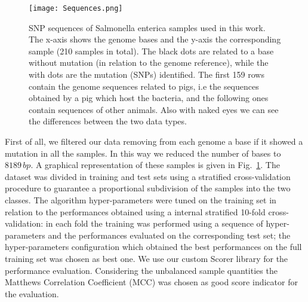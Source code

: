 \documentclass{standalone}
\begin{document}
\begin{figure}[htbp]
\centering
% 
\texttt{[image: Sequences.png]}
\caption{SNP sequences of Salmonella enterica samples used in this work.
The x-axis shows the genome bases and the y-axis the corresponding sample (210 samples in total).
The black dots are related to a base without mutation (in relation to the genome reference), while the with dots are the mutation (SNPs) identified.
The first 159 rows contain the genome sequences related to pigs, i.e the sequences obtained by a pig which host the bacteria, and the following ones contain sequences of other animals.
Also with naked eyes we can see the differences between the two data types.
}
\label{fig:SNPsAle}
\end{figure}

First of all, we filtered our data removing from each genome a base if it showed a mutation in all the samples.
In this way we reduced the number of bases to $8189\,bp$.
A graphical representation of these samples is given in Fig.~\ref{fig:SNPsAle}.
The dataset was divided in training and test sets using a stratified cross-validation procedure to guarantee a proportional subdivision of the samples into the two classes.
The algorithm hyper-parameters were tuned on the training set in relation to the performances obtained using a internal stratified 10-fold cross-validation: in each fold the training was performed using a sequence of hyper-parameters and the performances evaluated on the corresponding test set; the hyper-parameters configuration which obtained the best performances on the full training set was chosen as best one.
We use our custom \textsf{Scorer} library for the performance evaluation.
Considering the unbalanced sample quantities the Matthews Correlation Coefficient (MCC) was chosen as good score indicator for the evaluation.
\end{document}
